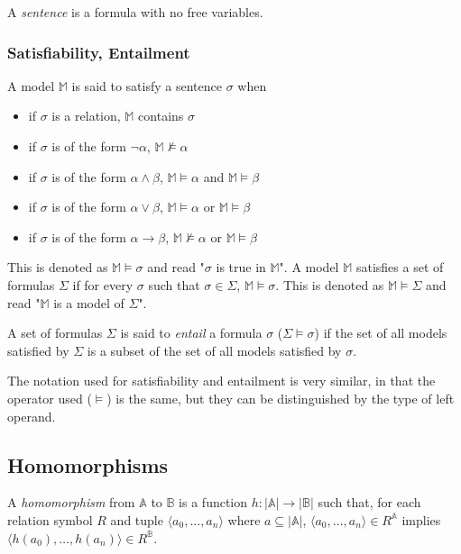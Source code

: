 			A \emph{sentence} is a formula with no free variables.

		\subsubsection{Satisfiability, Entailment}

			A model $\mathbb{M}$ is said to satisfy a sentence $\sigma$ when
			\begin{itemize}
			\item if $\sigma$ is a relation, $\mathbb{M}$ contains $\sigma$
			\item if $\sigma$ is of the form $\neg\alpha$, $\mathbb{M} \not\models \alpha$
			\item if $\sigma$ is of the form $\alpha\wedge\beta$, $\mathbb{M} \models \alpha$ and $\mathbb{M} \models \beta$
			\item if $\sigma$ is of the form $\alpha\vee\beta$, $\mathbb{M} \models \alpha$ or $\mathbb{M} \models \beta$
			\item if $\sigma$ is of the form $\alpha\to\beta$, $\mathbb{M} \not\models \alpha$ or $\mathbb{M} \models \beta$
			\end{itemize}
			This is denoted as $\mathbb{M} \models \sigma$ and read "$\sigma$
			is true in $\mathbb{M}$".  A model $\mathbb{M}$ satisfies a set of
			formulas $\Sigma$ if for every $\sigma$ such that $\sigma \in
			\Sigma$, $\mathbb{M} \models \sigma$.  This is denoted as
			$\mathbb{M} \models \Sigma$ and read "$\mathbb{M}$ is a model of
			$\Sigma$".

			A set of formulas $\Sigma$ is said to \emph{entail} a formula
			$\sigma$ ($\Sigma \models \sigma$) if the set of all models
			satisfied by $\Sigma$ is a subset of the set of all models
			satisfied by $\sigma$.

			The notation used for satisfiability and entailment is very
			similar, in that the operator used ($\models$) is the same, but
			they can be distinguished by the type of left operand.

	\subsection{Homomorphisms}

		A \emph{homomorphism} from $\mathbb{A}$ to $\mathbb{B}$ is a function
		$h: |\mathbb{A}|\to|\mathbb{B}|$ such that, for each relation symbol
		$R$ and tuple $\langle a_0 , \ldots , a_n \rangle$ where $a \subseteq
		|\mathbb{A}|$, $\langle a_0 , \ldots , a_n  \rangle \in R^\mathbb{A}$
		implies $\langle h(a_0) , \ldots , h(a_n) \rangle \in R^\mathbb{B}$.

